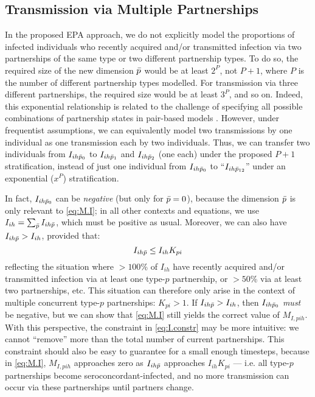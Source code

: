 \subsection{Transmission via Multiple Partnerships}\label{foi.prop.mp}
In the proposed EPA approach,
we do not explicitly model the proportions of infected individuals
who recently acquired and/or transmitted infection via
two partnerships of the same type or two different partnership types.
To do so, the required size of the new dimension $\bar{p}$ would be at least $2^{P}$, not $P+1$,
where $P$ is the number of different partnership types modelled.
For transmission via three different partnerships,
the required size would be at least $3^{P}$, and so on.
Indeed, this exponential relationship is related to the challenge of specifying
all possible combinations of partnership states in pair-based models \cite{Kretzschmar2017}.
However, under frequentist assumptions, we can equivalently model
two transmissions by one individual as one transmission each by two individuals.
Thus, we can transfer two individuals from $I_{ih\bar{p}_0}$ to
$I_{ih\bar{p}_1}$ and $I_{ih\bar{p}_2}$ (one each) under the proposed $P+1$ stratification,
instead of just one individual from $I_{ih\bar{p}_0}$ to
``$I_{ih\bar{p}_{12}}$'' under an exponential ($x^P$) stratification.
\par
In fact, $I_{ih\bar{p}_0}$ can be \emph{negative} (but only for $\bar{p} = 0$),
because the dimension $\bar{p}$ is only relevant to \eqref{eq:M.I};
in all other contexts and equations,
we use $I_{ih} = \sum_{\bar{p}} I_{ih\bar{p}}$, which must be positive as usual.
Moreover, we can also have $I_{ih\bar{p}} > I_{ih}$, provided that:
\begin{equation}\label{eq:I.constr}
  I_{ih\bar{p}} \le I_{ih} K_{pi}
\end{equation}
reflecting the situation where $>100$\% of $I_{ih}$
have recently acquired and/or transmitted infection via at least one type-$p$ partnership,
or $>50$\% via at least two partnerships, etc.
This situation can therefore only arise in the context of
multiple concurrent type-$p$ partnerships: $K_{pi} > 1$.
If $I_{ih\bar{p}} > I_{ih}$, then $I_{ih\bar{p}_0}$ \emph{must} be negative,
but we can show that \eqref{eq:M.I} still yields the correct value of $M_{I,pih}$.
With this perspective, the constraint in \eqref{eq:I.constr} may be more intuitive:
we cannot ``remove'' more than the total number of current partnerships.
This constraint should also be easy to guarantee for a small enough timesteps,
because in \eqref{eq:M.I}, $M_{I,pih}$ approaches zero as $I_{ih\bar{p}}$ approaches $I_{ih} K_{pi}$
--- i.e. all type-$p$ partnerships become seroconcordant-infected,
and no more transmission can occur via these partnerships until partners change.
